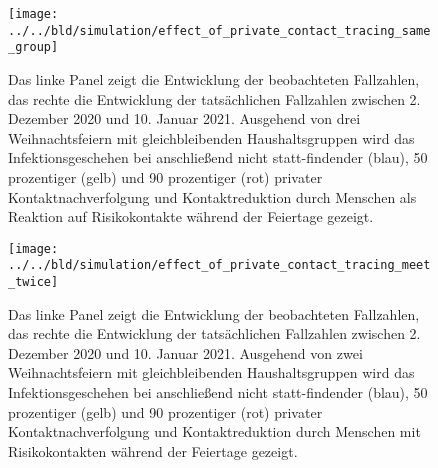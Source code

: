 \documentclass[a4paper,11pt,leqno,fleqn]{article}
\begin{document}
\FloatBarrier



\begin{figure}
\label{fig:effect_of_contact_tracing_with_same_group_christmas}
\texttt{[image: ../../bld/simulation/effect\_of\_private\_contact\_tracing\_same\_group]}
\caption{
    Das linke Panel zeigt die Entwicklung der beobachteten Fallzahlen, das rechte die Entwicklung der tatsächlichen Fallzahlen zwischen 2. Dezember 2020 und 10. Januar 2021. Ausgehend von drei Weihnachtsfeiern mit gleichbleibenden Haushaltsgruppen wird das Infektionsgeschehen bei anschließend nicht statt-findender (blau), 50 prozentiger (gelb) und 90 prozentiger (rot)    privater Kontaktnachverfolgung und Kontaktreduktion durch Menschen als Reaktion auf  Risikokontakte während der Feiertage gezeigt.
}
\end{figure}


\FloatBarrier


\begin{figure}
\label{fig:effect_of_contact_tracing_with_meet_twice_christmas}
\texttt{[image: ../../bld/simulation/effect\_of\_private\_contact\_tracing\_meet\_twice]}
\caption{
   Das linke Panel zeigt die Entwicklung der beobachteten Fallzahlen, das rechte die Entwicklung der tatsächlichen Fallzahlen zwischen 2. Dezember 2020 und 10. Januar 2021. Ausgehend von zwei Weihnachtsfeiern mit gleichbleibenden Haushaltsgruppen wird das Infektionsgeschehen bei anschließend nicht statt-findender (blau), 50 prozentiger (gelb) und 90 prozentiger (rot)
   privater Kontaktnachverfolgung und Kontaktreduktion durch Menschen mit Risikokontakten
   während der Feiertage gezeigt.
}
\end{figure}


\FloatBarrier
\end{document}
